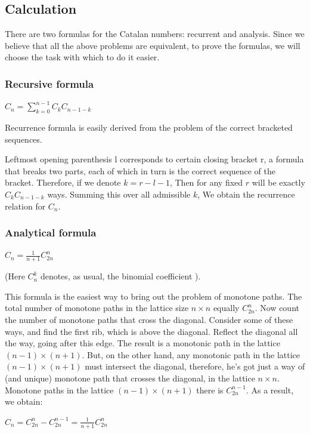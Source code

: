 \subsection{ Calculation }

There are two formulas for the Catalan numbers: recurrent and analysis. Since we believe that all the above problems are equivalent, to prove the formulas, we will choose the task with which to do it easier.

\subsubsection{ Recursive formula }

$C_n = \sum_ {k = 0} ^ {n-1} C_k C_ {n-1-k}$

Recurrence formula is easily derived from the problem of the correct bracketed sequences.

Leftmost opening parenthesis l corresponds to certain closing bracket r, a formula that breaks two parts, each of which in turn is the correct sequence of the bracket. Therefore, if we denote $k = r-l-1$, Then for any fixed $r$ will be exactly $C_k C_ {n-1-k}$ ways. Summing this over all admissible $k$, We obtain the recurrence relation for $C_n$.

\subsubsection{ Analytical formula }

$C_n = \frac {1} {n +1} C_ {2n} ^ {n}$

(Here $C_n ^ k$ denotes, as usual, the binomial coefficient ).

This formula is the easiest way to bring out the problem of monotone paths. The total number of monotone paths in the lattice size $n \times n$ equally $C_ {2n} ^ {n}$. Now count the number of monotone paths that cross the diagonal. Consider some of these ways, and find the first rib, which is above the diagonal. Reflect the diagonal all the way, going after this edge. The result is a monotonic path in the lattice $(n-1) \times (n +1)$. But, on the other hand, any monotonic path in the lattice $(n-1) \times (n +1)$ must intersect the diagonal, therefore, he's got just a way of (and unique) monotone path that crosses the diagonal, in the lattice $n \times n$. Monotone paths in the lattice $(n-1) \times (n +1)$ there is $C_ {2n} ^ {n-1}$. As a result, we obtain:

$C_{n}=C_{2n}^{n}-C_{2n}^{n-1}=\frac{1}{n+1}C_{2n}^{n}$

